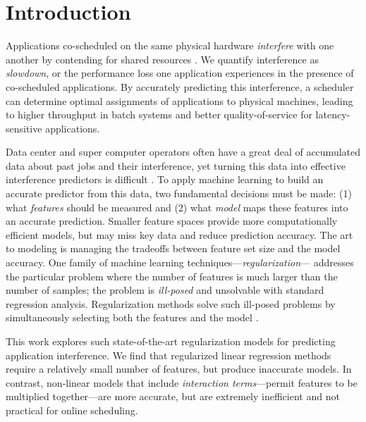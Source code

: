 \section{Introduction}
Applications co-scheduled on the same physical hardware
\emph{interfere} with one another by contending for shared resources
\cite{dwyer2012practical,kambadur2012measuring,Bubble-flux,merkel2010resource}.
We quantify interference as \emph{slowdown}, or the performance loss
one application experiences in the presence of co-scheduled
applications.  By accurately predicting this interference, a scheduler
can determine optimal assignments of applications to physical
machines, leading to higher throughput in batch systems and better
quality-of-service for latency-sensitive applications.

Data center and super computer operators often have a great deal of
accumulated data about past jobs and their interference, yet turning
this data into effective interference predictors is difficult
\cite{kambadur2012measuring}.  To apply machine learning to build an
accurate predictor from this data, two fundamental decisions must be
made: (1) what \emph{features} should be measured and (2) what
\emph{model} maps these features into an accurate prediction.  Smaller
feature spaces provide more computationally efficient models, but
may miss key data and reduce prediction accuracy.  The art to modeling
is managing the tradeoffs between feature set size and the model
accuracy.  One family of machine learning
techniques---\emph{regularization}--- addresses the particular problem
where the number of features is much larger than the number of
samples; \ie the problem is \emph{ill-posed} and unsolvable with
standard regression analysis.  Regularization methods solve such
ill-posed problems by simultaneously selecting both the features and
the model
\cite{hoerl1988ridge,tibshirani1996regression,zou2005regularization}.

This work explores such state-of-the-art regularization models for
predicting application interference.  We find that regularized linear
regression methods require a relatively small number of features, but
produce inaccurate models.  In contrast, non-linear models that
include \emph{interaction terms}---\ie permit features to be
multiplied together---are more accurate, but are extremely inefficient
and not practical for online scheduling.

